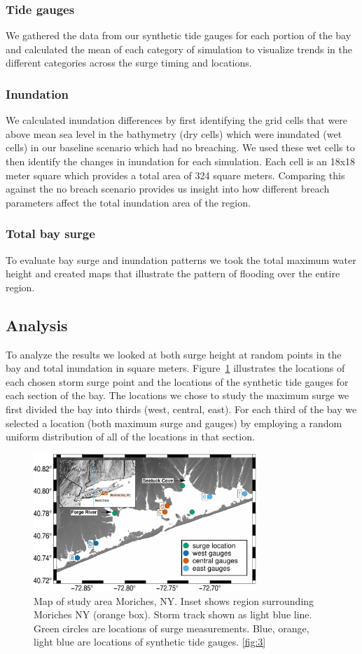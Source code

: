 \documentclass{coastal_paper}
\begin{document}
\subsubsection{Tide gauges}
We gathered the data from our synthetic tide gauges for each portion of the bay and calculated the mean of each category of simulation to visualize trends in the different categories across the surge timing and locations.
\subsubsection{Inundation}
We calculated inundation differences by first identifying the grid cells that were above mean sea level in the bathymetry (dry cells) which were inundated  (wet cells) in our baseline scenario which had no breaching. We used these wet cells to then identify the changes in inundation for each simulation. Each cell is an 18x18 meter square which provides a total area of 324 square meters. Comparing this against the no breach scenario provides us insight into how different breach parameters affect the total inundation area of the region. 
\subsubsection{Total bay surge}
To evaluate bay surge and inundation patterns we took the total maximum water height and created maps that illustrate the pattern of flooding over the entire region.

\subsection{Analysis}
To analyze the results we looked at both surge height at random points in the bay and total inundation in square meters. Figure~\ref{fig:2} illustrates the locations of each chosen storm surge point and the locations of the synthetic tide gauges for each section of the bay. The locations we chose to study the maximum surge we first divided the bay into thirds (west, central, east). For each third of the bay we selected a location (both maximum surge and gauges) by employing a random uniform distribution of all of the locations in that section. 
\begin{figure}
    \centering
    \includegraphics[width=0.75\textwidth]{figures/fig2_v2.pdf}
    \caption{Map of study area Moriches, NY. Inset shows region surrounding Moriches NY (orange box). Storm track shown as light blue line. Green circles are locations of surge measurements. Blue, orange, light blue are locations of synthetic tide gauges. \ref{fig:3}}
    \label{fig:2}
\end{figure}
\end{document}
